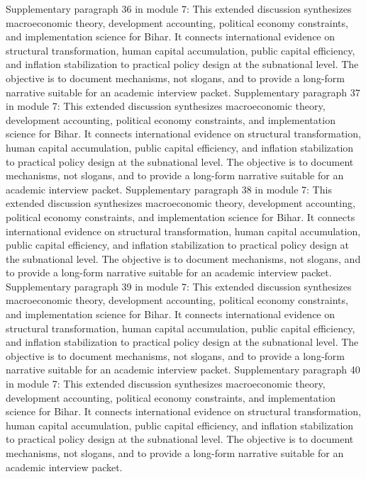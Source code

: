 \documentclass[preprint,12pt]{elsarticle}
\begin{document}
Supplementary paragraph 36 in module 7: This extended discussion synthesizes macroeconomic theory, development accounting, political economy constraints, and implementation science for Bihar. It connects international evidence on structural transformation, human capital accumulation, public capital efficiency, and inflation stabilization to practical policy design at the subnational level. The objective is to document mechanisms, not slogans, and to provide a long-form narrative suitable for an academic interview packet.
Supplementary paragraph 37 in module 7: This extended discussion synthesizes macroeconomic theory, development accounting, political economy constraints, and implementation science for Bihar. It connects international evidence on structural transformation, human capital accumulation, public capital efficiency, and inflation stabilization to practical policy design at the subnational level. The objective is to document mechanisms, not slogans, and to provide a long-form narrative suitable for an academic interview packet.
Supplementary paragraph 38 in module 7: This extended discussion synthesizes macroeconomic theory, development accounting, political economy constraints, and implementation science for Bihar. It connects international evidence on structural transformation, human capital accumulation, public capital efficiency, and inflation stabilization to practical policy design at the subnational level. The objective is to document mechanisms, not slogans, and to provide a long-form narrative suitable for an academic interview packet.
Supplementary paragraph 39 in module 7: This extended discussion synthesizes macroeconomic theory, development accounting, political economy constraints, and implementation science for Bihar. It connects international evidence on structural transformation, human capital accumulation, public capital efficiency, and inflation stabilization to practical policy design at the subnational level. The objective is to document mechanisms, not slogans, and to provide a long-form narrative suitable for an academic interview packet.
Supplementary paragraph 40 in module 7: This extended discussion synthesizes macroeconomic theory, development accounting, political economy constraints, and implementation science for Bihar. It connects international evidence on structural transformation, human capital accumulation, public capital efficiency, and inflation stabilization to practical policy design at the subnational level. The objective is to document mechanisms, not slogans, and to provide a long-form narrative suitable for an academic interview packet.
\end{document}
